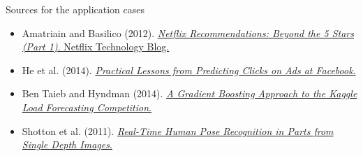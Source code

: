 \begin{frame}[t]{Sources for the application cases}
\small
\begin{itemize}\setlength{\itemsep}{.24cm}
\item Amatriain and Basilico (2012). \href{https://netflixtechblog.com/netflix-recommendations-beyond-the-5-stars-part-1-55838468f429}{\textit{Netflix Recommendations: Beyond the 5 Stars (Part 1)}. Netflix Technology Blog.}
\item He et al. (2014). \href{https://quinonero.net/Publications/predicting-clicks-facebook.pdf}{\textit{Practical Lessons from Predicting Clicks on Ads at Facebook}.}
\item Ben Taieb and Hyndman (2014). \href{https://robjhyndman.com/papers/kaggle-competition.pdf}{\textit{A Gradient Boosting Approach to the Kaggle Load Forecasting Competition}.}
\item Shotton et al. (2011). \href{https://www.microsoft.com/en-us/research/wp-content/uploads/2016/02/BodyPartRecognition.pdf}{\textit{Real-Time Human Pose Recognition in Parts from Single Depth Images}.}
\end{itemize}
\end{frame}
